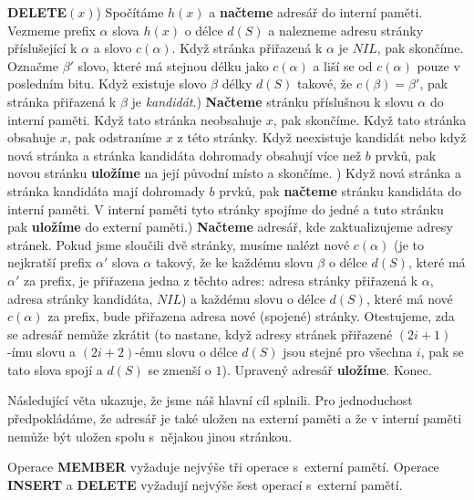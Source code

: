 \documentclass[a4paper,12pt]{article}
\begin{document}
{\bf DELETE$(x)$}) Spočítáme $h(x)$ a {\bf načteme} adresář do interní paměti. 
Vez\-me\-me prefix $\alpha$ slova $h(x)$ o délce $d(S)$ a nalezneme 
adresu stránky příslušející k $\alpha$ a slovo $
c(\alpha )$. 
Když stránka přiřazená k $\alpha$ je $NIL$, pak skončíme. 
Označme $\beta'$ slovo, které má stejnou délku jako $c(\alpha 
)$ a 
liší se od $c(\alpha )$ pouze v posledním bitu. Když existuje 
slovo $\beta$ délky $d(S)$ takové, že $c(\beta )=\beta'$, pak stránka 
přiřazená k $\beta$ je \emph{kandidát}.) {\bf Načteme} stránku příslušnou k slovu $\alpha$ do interní 
paměti. Když tato stránka neobsahuje $x$, pak skončíme. 
Když tato stránka obsahuje $x$, pak odstraníme $x$ z této 
stránky. Když neexistuje kandidát nebo když nová 
stránka a stránka kandidáta dohromady obsahují více než $
b$ 
prvků, pak novou stránku {\bf ulo\-žíme} na její 
původní místo a skončíme. ) Když nová stránka a stránka kandidáta mají 
dohromady $b$ prvků, pak {\bf načteme} stránku 
kandidáta do interní paměti. V interní paměti tyto 
stránky spojíme do jedné a tuto stránku pak 
{\bf ulo\-žíme} do externí paměti.) {\bf Načteme} adresář, kde zaktualizujeme adresy 
stránek. Po\-kud jsme sloučili dvě stránky, musíme nalézt 
nové $c(\alpha )$ (je to nejkratší prefix $\alpha'$ slova $
\alpha$ takový, že 
ke každému slovu $\beta$ o délce $d(S)$, které má $\alpha'$ za prefix, 
je přiřazena jedna z těchto adres: adresa stránky 
přiřazená k $\alpha$, adresa stránky kandidáta, $NIL$) a každému 
slovu o délce $d(S)$, které má nové $c(\alpha )$ za prefix, bude 
přiřazena adresa nové (spojené) stránky. Otestujeme, zda 
se adresář nemůže zkrátit (to nastane, když 
adresy stránek přiřazené $(2i+1)$-ímu slovu a $(2i+
2)$-ému 
slovu o délce $d(S)$ jsou stejné pro všechna $i$, 
pak se tato slova spojí a $d(S)$ se zmenší o $1$). Upravený 
adresář {\bf uložíme}. Konec.


Následující věta ukazuje, že jsme náš hlavní cíl splnili. Pro jednoduchost předpokládáme, že 
adresář je také uložen na externí paměti a že v 
interní paměti nemůže být uložen spolu s~nějakou jinou stránkou. 

\begin{veta}Operace {\bf MEMBER} vyžaduje nejvýše tři 
operace s~externí pamětí. Operace {\bf INSERT} a {\bf DELETE }
vyžadují nejvýše šest operací s~externí pamětí.
\end{veta}
\end{document}
